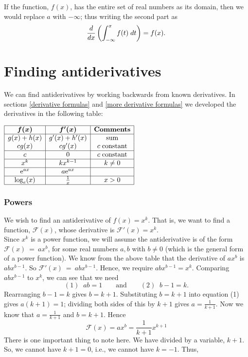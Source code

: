 \noindent If the function, $f(x)$, has the entire set of real numbers as its domain, then we would replace $a$ with $-\infty$; thus writing the second part as
\[
\frac{d}{dx}\left(\int_{-\infty}^xf(t) \;dt\right) = f(x).
\]

\section{Finding antiderivatives} \label{derivativetable1}
We can find antiderivatives by working backwards from known derivatives. In sections \ref{derivative formulas} and \ref{more derivative formulas} we developed the derivatives in the following table:
\begin{center}
$\begin{array}{|c|c|c|} \hline
 \boldsymbol{f(x)} 			& \boldsymbol{f'(x)} 		& \textbf{Comments} \\ \hline
g(x) + h(x)	& g'(x) + h'(x)   & \text{sum} \\
cg(x)			& cg'(x)		& c \; \text{constant} \\ \hline
c 			& 0 			& c \; \text{constant} \\ \hline
x^k			& kx^{k-1} 	& k \neq 0	  	      	\\ \hline
\mathrm{e}^{ax}		&a\mathrm{e}^{ax} 	&				\\ \hline
\log_e(x)		&\frac{1}{x}	& x > 0			\\ \hline
\end{array}$
\end{center}

\subsubsection{Powers}
We wish to find an antiderivative of $f(x) = x^k$. That is, we want to find a function, $\mathcal{F}(x)$, whose derivative is $\mathcal{F}'(x) = x^k$. \\

\noindent Since $x^k$ is a power function, we will assume the antiderivative is of the form $\mathcal{F}(x)~=~ax^b$, for some real numbers $a,b$ with $b \neq 0$ (which is the general form of a power function). We know from the above table that the derivative of $ax^b$ is $abx^{b-1}$. So $\mathcal{F}'(x)~=~abx^{b-1}$. Hence, we require $abx^{b-1} = x^k$. Comparing $abx^{b-1}$ to $x^k$, we can see that we need
\[
(1) \;\; ab = 1 \qquad \text{and} \qquad (2) \;\; b-1 = k.
\]
Rearranging $b-1 = k$ gives $b = k + 1$. Substituting $b = k + 1$ into equation (1) gives $a(k+1) = 1$; dividing both sides of this by $k+1$ gives $a = \frac{1}{k+1}$. Now we know that $a = \frac{1}{k+1}$ and $b = k + 1$. Hence
\[
\mathcal{F}(x) = ax^b = \frac{1}{k+1}x^{k+1}
\] 
There is one important thing to note here. We have divided by a variable, $k+1$. So, we cannot have $k + 1 = 0$, i.e., we cannot have $k = -1$.
Thus,

